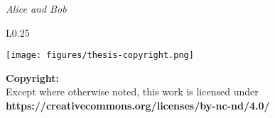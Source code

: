 \vfill
\begin{flushright}
    \vfill
	\hfill
	\emph{Alice and Bob}\\
	\vfill
\end{flushright}
\mbox{}
\vfill
\begin{wrapfigure}{L}{0.25\textwidth}
    \begin{center}
        \vspace{-\baselineskip}
        \texttt{[image: figures/thesis-copyright.png]}
    \end{center}
\end{wrapfigure}
\noindent
\textbf{Copyright:}\\
Except where otherwise noted,
this work is licensed under\\
\textbf{https://creativecommons.org/licenses/by-nc-nd/4.0/}